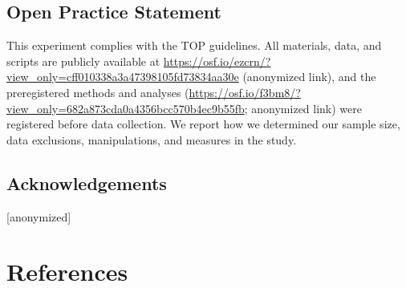 \documentclass[
  man,
  floatsintext,
  longtable,
  nolmodern,
  notxfonts,
  notimes,
  mask,
  colorlinks=true,linkcolor=blue,citecolor=blue,urlcolor=blue]{apa7}
\begin{document}
\subsection{Open Practice Statement}\label{open-practice-statement}

This experiment complies with the TOP guidelines. All materials, data,
and scripts are publicly available at
\url{https://osf.io/ezcrn/?view_only=cff010338a3a47398105fd73834aa30e}
(anonymized link), and the preregistered methods and analyses
(\url{https://osf.io/f3bm8/?view_only=682a873cda0a4356bcc570b4ec9b55fb};
anonymized link) were registered before data collection. We report how
we determined our sample size, data exclusions, manipulations, and
measures in the study.

\subsection{Acknowledgements}\label{acknowledgements}

{[}anonymized{]}

\section{References}\label{references}
\end{document}
